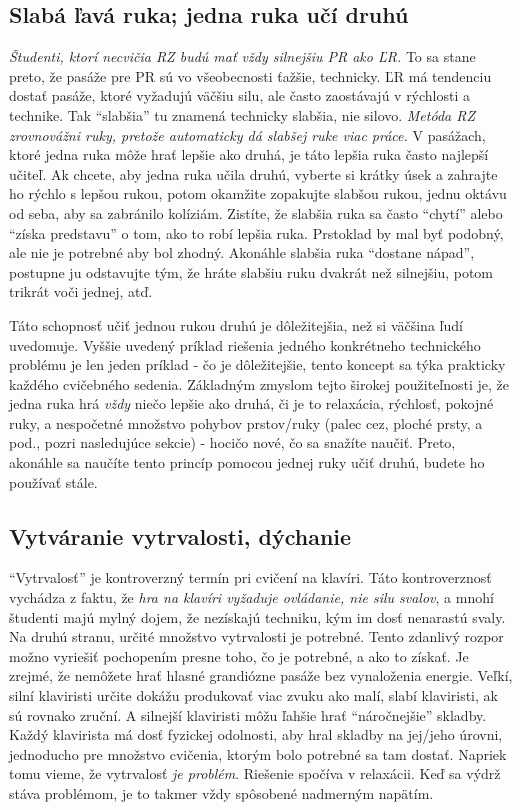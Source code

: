 \subsection{Slabá ľavá ruka; jedna ruka učí druhú}
\emph{Študenti, ktorí necvičia RZ budú mať vždy silnejšiu PR ako ĽR.} To sa stane preto, že pasáže pre PR sú vo všeobecnosti ťažšie, technicky. ĽR má tendenciu dostať pasáže, ktoré vyžadujú väčšiu silu, ale často zaostávajú v rýchlosti a technike. Tak “slabšia” tu znamená technicky slabšia, nie silovo. \emph{Metóda RZ zrovnovážni ruky, pretože automaticky dá slabšej ruke viac práce.} V pasážach, ktoré jedna ruka môže hrať lepšie ako druhá, je táto lepšia ruka často najlepší učiteľ. Ak chcete, aby jedna ruka učila druhú, vyberte si krátky úsek a zahrajte ho rýchlo s lepšou rukou, potom okamžite zopakujte slabšou rukou, jednu oktávu od seba, aby sa zabránilo kolíziám. Zistíte, že slabšia ruka sa často “chytí” alebo “získa predstavu” o tom, ako to robí lepšia ruka. Prstoklad by mal byť podobný, ale nie je potrebné aby bol zhodný. Akonáhle slabšia ruka “dostane nápad”, postupne ju odstavujte tým, že hráte slabšiu ruku dvakrát než silnejšiu, potom trikrát voči jednej, atď.

Táto schopnosť učiť jednou rukou druhú je dôležitejšia, než si väčšina ľudí uvedomuje. Vyššie uvedený príklad riešenia jedného konkrétneho technického problému je len jeden príklad - čo je dôležitejšie, tento koncept sa týka prakticky každého cvičebného sedenia. Základným zmyslom tejto širokej použiteľnosti je, že jedna ruka hrá \textit{vždy} niečo lepšie ako druhá, či je to relaxácia, rýchlosť, pokojné ruky, a nespočetné množstvo pohybov prstov/ruky (palec cez, ploché prsty, a pod., pozri nasledujúce sekcie) - hocičo nové, čo sa snažíte naučiť. Preto, akonáhle sa naučíte tento princíp pomocou jednej ruky učiť druhú, budete ho používať stále.

\subsection{Vytváranie vytrvalosti, dýchanie}
“Vytrvalosť” je kontroverzný termín pri cvičení na klavíri. Táto kontroverznosť vychádza z faktu, že \emph{hra na klavíri vyžaduje ovládanie, nie silu svalov}, a mnohí študenti majú mylný dojem, že nezískajú techniku, kým im dosť nenarastú svaly. Na druhú stranu, určité množstvo vytrvalosti je potrebné. Tento zdanlivý rozpor možno vyriešiť pochopením presne toho, čo je potrebné, a ako to získať. Je zrejmé, že nemôžete hrať hlasné grandiózne pasáže bez vynaloženia energie. Veľkí, silní klaviristi určite dokážu produkovať viac zvuku ako malí, slabí klaviristi, ak sú rovnako zruční. A silnejší klaviristi môžu ľahšie hrať “náročnejšie” skladby. Každý klavirista má dosť fyzickej odolnosti, aby hral skladby na jej/jeho úrovni, jednoducho pre množstvo cvičenia, ktorým bolo potrebné sa tam dostať. Napriek tomu vieme, že vytrvalosť \textit{je problém}. Riešenie spočíva v relaxácii. Keď sa výdrž stáva problémom, je to takmer vždy spôsobené nadmerným napätím.

